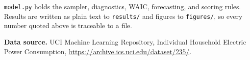 \documentclass[11pt]{article}
\newcommand{\code}[1]{\texttt{\small #1}}
\begin{document}
\code{model.py} holds the sampler, diagnostics, WAIC, forecasting, and scoring
rules. Results are written as plain text to \code{results/} and figures to
\code{figures/}, so every number quoted above is traceable to a file.

\vspace{6pt}
\noindent\textbf{Data source.} UCI Machine Learning Repository, Individual
Household Electric Power Consumption,
\url{https://archive.ics.uci.edu/dataset/235/}.
\end{document}
